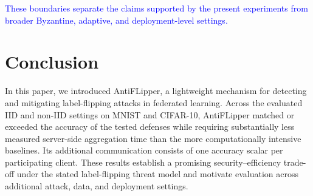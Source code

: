 \documentclass[conference]{IEEEtran}
\begin{document}
\textcolor{blue}{These boundaries separate the claims supported by the present experiments from broader Byzantine, adaptive, and deployment-level settings.}

\section{Conclusion}
\label{sec:conclusion}

In this paper, we introduced AntiFLipper, a lightweight mechanism for detecting and mitigating label-flipping attacks in federated learning. Across the evaluated IID and non-IID settings on MNIST and CIFAR-10, AntiFLipper matched or exceeded the accuracy of the tested defenses while requiring substantially less measured server-side aggregation time than the more computationally intensive baselines. Its additional communication consists of one accuracy scalar per participating client. These results establish a promising security--efficiency trade-off under the stated label-flipping threat model and motivate evaluation across additional attack, data, and deployment settings.




\end{document}
